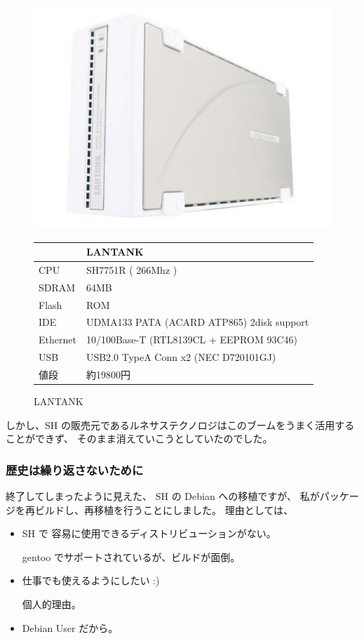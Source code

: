 \documentclass[mingoth,a4paper]{jsarticle}
\begin{document}
\begin{figure}[htbp]
 \begin{minipage}{0.5\hsize}
  \includegraphics[width=0.9\hsize]{image200705/lantank00.jpg}
  \caption{LANTANK}
 \end{minipage}
 \begin{minipage}{0.5\hsize}
  \begin{tabular}{|l|l|} \hline
   & LANTANK \\ \hline
   CPU & SH7751R ( 266Mhz ) \\ \hline
   SDRAM & 64MB\\ \hline
   Flash & ROM \\ \hline
   IDE & UDMA133 PATA (ACARD ATP865) 2disk support  \\ \hline
   Ethernet & 10/100Base-T (RTL8139CL + EEPROM 93C46) \\ \hline
   USB & USB2.0 TypeA Conn x2 (NEC D720101GJ) \\ \hline
   値段 & 約19800円 \\ \hline
  \end{tabular}
 \end{minipage}
\end{figure}

しかし、SH の販売元であるルネサステクノロジはこのブームをうまく活用することができず、
そのまま消えていこうとしていたのでした。

\subsubsection{歴史は繰り返さないために}
終了してしまったように見えた、 SH の Debian への移植ですが、
私がパッケージを再ビルドし、再移植を行うことにしました。
理由としては、
\begin{itemize}
 \item SH で 容易に使用できるディストリビューションがない。
 
       gentoo でサポートされているが、ビルドが面倒。
 
 \item 仕事でも使えるようにしたい :)
       
	個人的理由。

 \item Debian User だから。
 
\end{itemize}
\end{document}
